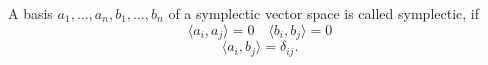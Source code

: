 A basis $a_1, \ldots, a_n, b_1, \ldots, b_n$ of a symplectic vector space is called symplectic, if
$$\langle a_i, a_j \rangle = 0 \quad \langle b_i, b_j \rangle = 0$$
$$\langle a_i, b_j \rangle = \delta_{ij}.$$
